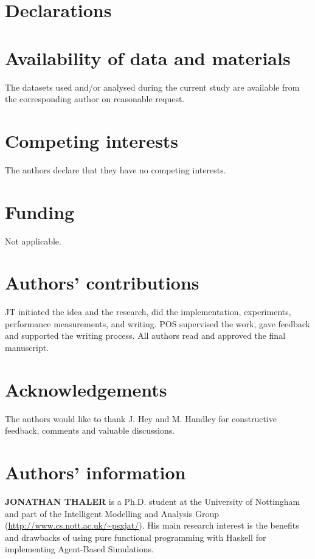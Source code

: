 \documentclass{bmcart}
\begin{document}
\begin{backmatter}


\section*{Declarations}
\section*{Availability of data and materials}
The datasets used and/or analysed during the current study are available from the corresponding author on reasonable request.

\section*{Competing interests}
The authors declare that they have no competing interests.

\section*{Funding}
Not applicable.

\section*{Authors' contributions}
JT initiated the idea and the research, did the implementation, experiments, performance measurements, and writing. POS supervised the work, gave feedback and supported the writing process. All authors read and approved the final manuscript.

\section*{Acknowledgements}
The authors would like to thank J. Hey and M. Handley for constructive feedback, comments and valuable discussions.

\section*{Authors' information}
\textbf{\uppercase{JONATHAN THALER}} is a Ph.D. student at the University of Nottingham and part of the Intelligent Modelling and Analysis Group (\url{http://www.cs.nott.ac.uk/~psxjat/}). His main research interest is the benefits and drawbacks of using pure functional programming with Haskell for implementing Agent-Based Simulations.


\end{backmatter}
\end{document}
